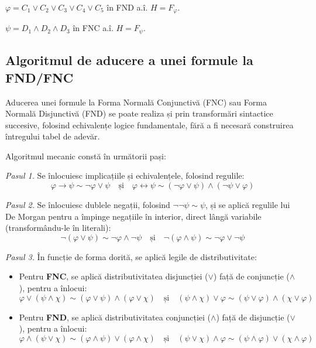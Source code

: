 \vspace{0.5cm}

\noindent $\varphi = C_1 \lor C_2 \lor C_3 \lor C_4 \lor C_5$ în FND a.î. $H = F_\varphi$.

\vspace{0.2cm}

\noindent $\psi = D_1 \land D_2 \land D_3$ în FNC a.î. $H = F_\psi$.

\subsection{Algoritmul de aducere a unei formule la FND/FNC}
\label{alg2:fn}

Aducerea unei formule la Forma Normală Conjunctivă (FNC) sau Forma Normală Disjunctivă (FND) se poate realiza și prin transformări sintactice succesive, folosind echivalențe logice fundamentale, fără a fi necesară construirea întregului tabel de adevăr.

\noindent Algoritmul mecanic constă în următorii pași:

\vspace{0.3cm}
\noindent \textit{Pasul 1.} Se înlocuiesc implicațiile și echivalențele, folosind regulile:
\[
	\varphi \rightarrow \psi \sim \neg \varphi \lor \psi \quad \text{și} \quad \varphi \leftrightarrow \psi \sim (\neg \varphi \lor \psi) \land (\neg \psi \lor \varphi)
\]

\vspace{0.2cm}
\noindent \textit{Pasul 2.} Se înlocuiesc dublele negații, folosind $\neg\neg\psi \sim \psi$, și se aplică regulile lui De Morgan pentru a împinge negațiile în interior, direct lângă variabile (transformându-le în literali):
\[
	\neg(\varphi \lor \psi) \sim \neg \varphi \land \neg \psi \quad \text{și} \quad \neg(\varphi \land \psi) \sim \neg \varphi \lor \neg \psi
\]

\vspace{0.2cm}
\noindent \textit{Pasul 3.} În funcție de forma dorită, se aplică legile de distributivitate:
\begin{itemize}
	\item Pentru \textbf{FNC}, se aplică distributivitatea disjuncției ($\lor$) față de conjuncție ($\land$), pentru a înlocui:
	      \[
		      \varphi \lor (\psi \land \chi) \sim (\varphi \lor \psi) \land (\varphi \lor \chi) \quad \text{și} \quad (\psi \land \chi) \lor \varphi \sim (\psi \lor \varphi) \land (\chi \lor \varphi)
	      \]
	\item Pentru \textbf{FND}, se aplică distributivitatea conjuncției ($\land$) față de disjuncție ($\lor$), pentru a înlocui:
	      \[
		      \varphi \land (\psi \lor \chi) \sim (\varphi \land \psi) \lor (\varphi \land \chi) \quad \text{și} \quad (\psi \lor \chi) \land \varphi \sim (\psi \land \varphi) \lor (\chi \land \varphi)
	      \]
\end{itemize}

